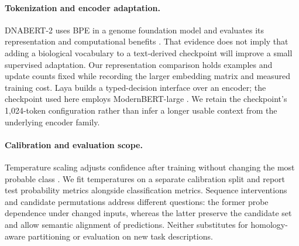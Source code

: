 \paragraph{Tokenization and encoder adaptation.}
DNABERT-2 uses BPE in a genome foundation model and evaluates its representation and computational benefits \citep{zhou2024dnabert}. That evidence does not imply that adding a biological vocabulary to a text-derived checkpoint will improve a small supervised adaptation. Our representation comparison holds examples and update counts fixed while recording the larger embedding matrix and measured training cost. Laya builds a typed-decision interface over an encoder; the checkpoint used here employs ModernBERT-large \citep{warner2025modernbert,laya2026}. We retain the checkpoint's 1,024-token configuration rather than infer a longer usable context from the underlying encoder family.

\paragraph{Calibration and evaluation scope.}
Temperature scaling adjusts confidence after training without changing the most probable class \citep{guo2017calibration}. We fit temperatures on a separate calibration split and report test probability metrics alongside classification metrics. Sequence interventions and candidate permutations address different questions: the former probe dependence under changed inputs, whereas the latter preserve the candidate set and allow semantic alignment of predictions. Neither substitutes for homology-aware partitioning or evaluation on new task descriptions.
